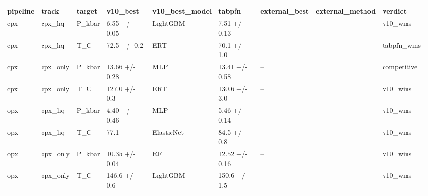 \begin{tabular}{lllllllll}
\toprule
pipeline & track & target & v10\_best & v10\_best\_model & tabpfn & external\_best & external\_method & verdict \\
\midrule
cpx & cpx\_liq & P\_kbar & 6.55 +/- 0.05 & LightGBM & 7.51 +/- 0.13 & -- &  & v10\_wins \\
cpx & cpx\_liq & T\_C & 72.5 +/- 0.2 & ERT & 70.1 +/- 1.0 & -- &  & tabpfn\_wins \\
cpx & cpx\_only & P\_kbar & 13.66 +/- 0.28 & MLP & 13.41 +/- 0.58 & -- &  & competitive \\
cpx & cpx\_only & T\_C & 127.0 +/- 0.3 & ERT & 130.6 +/- 3.0 & -- &  & v10\_wins \\
opx & opx\_liq & P\_kbar & 4.40 +/- 0.46 & MLP & 5.46 +/- 0.14 & -- &  & v10\_wins \\
opx & opx\_liq & T\_C & 77.1 & ElasticNet & 84.5 +/- 0.8 & -- &  & v10\_wins \\
opx & opx\_only & P\_kbar & 10.35 +/- 0.04 & RF & 12.52 +/- 0.16 & -- &  & v10\_wins \\
opx & opx\_only & T\_C & 146.6 +/- 0.6 & LightGBM & 150.6 +/- 1.5 & -- &  & v10\_wins \\
\bottomrule
\end{tabular}
